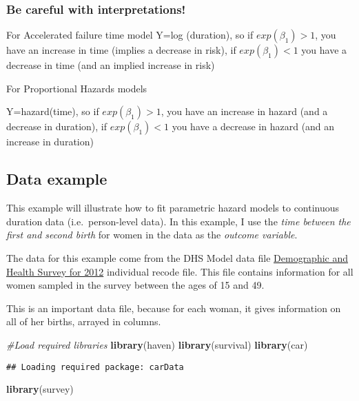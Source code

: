 \documentclass[
]{article}
\newenvironment{Shaded}{\begin{snugshade}}{\end{snugshade}}
\newcommand{\CommentTok}[1]{\textcolor[rgb]{0.56,0.35,0.01}{\textit{#1}}}
\newcommand{\KeywordTok}[1]{\textcolor[rgb]{0.13,0.29,0.53}{\textbf{#1}}}
\newcommand{\NormalTok}[1]{#1}
\begin{document}
\hypertarget{be-careful-with-interpretations}{%
\subsubsection{Be careful with
interpretations!}\label{be-careful-with-interpretations}}

For Accelerated failure time model Y=log (duration), so if
\(exp(\beta_1) > 1\), you have an increase in time (implies a decrease
in risk), if \(exp(\beta_1) < 1\) you have a decrease in time (and an
implied increase in risk)

For Proportional Hazards models

Y=hazard(time), so if \(exp(\beta_1) > 1\), you have an increase in
hazard (and a decrease in duration), if \(exp(\beta_1) < 1\) you have a
decrease in hazard (and an increase in duration)

\hypertarget{data-example}{%
\subsection{Data example}\label{data-example}}

This example will illustrate how to fit parametric hazard models to
continuous duration data (i.e.~person-level data). In this example, I
use the \emph{time between the first and second birth} for women in the
data as the \emph{outcome variable}.

The data for this example come from the DHS Model data file
\href{https://t.co/tM8LfJhomf}{Demographic and Health Survey for 2012}
individual recode file. This file contains information for all women
sampled in the survey between the ages of 15 and 49.

This is an important data file, because for each woman, it gives
information on all of her births, arrayed in columns.

\begin{Shaded}
\begin{Highlighting}[]
\CommentTok{#Load required libraries}
\KeywordTok{library}\NormalTok{(haven)}
\KeywordTok{library}\NormalTok{(survival)}
\KeywordTok{library}\NormalTok{(car)}
\end{Highlighting}
\end{Shaded}

\begin{verbatim}
## Loading required package: carData
\end{verbatim}

\begin{Shaded}
\begin{Highlighting}[]
\KeywordTok{library}\NormalTok{(survey)}
\end{Highlighting}
\end{Shaded}
\end{document}

